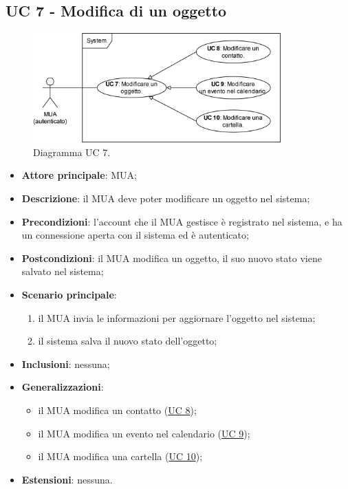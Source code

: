 \subsection{UC 7 - Modifica di un oggetto} \label{sec:UC7}
    \begin{figure}[h]
        \includegraphics[width=0.85\textwidth]{sections/uc_imgs/UC07.png}
        \centering
        \caption{Diagramma UC 7.}
    \end{figure}
    \begin{itemize}
        \item \textbf{Attore principale}: MUA;
        \item \textbf{Descrizione}: il MUA deve poter modificare un oggetto nel sistema;
        \item \textbf{Precondizioni}: l’account che il MUA gestisce è registrato nel sistema, e ha un connessione aperta con il sistema ed è autenticato;
        \item \textbf{Postcondizioni}: il MUA modifica un oggetto, il suo nuovo stato viene salvato nel sistema;
        \item \textbf{Scenario principale}:
            \begin{enumerate}
                \item il MUA invia le informazioni per aggiornare l'oggetto nel sistema;
                \item il sistema salva il nuovo stato dell'oggetto;
            \end{enumerate}
        \item \textbf{Inclusioni}: nessuna;
        \item \textbf{Generalizzazioni}:
            \begin{itemize}
                \item il MUA modifica un contatto (\hyperref[sec:UC8]{UC 8});
                \item il MUA modifica un evento nel calendario (\hyperref[sec:UC9]{UC 9});
                \item il MUA modifica una cartella (\hyperref[sec:UC10]{UC 10});
            \end{itemize}
        \item \textbf{Estensioni}: nessuna.
    \end{itemize}
